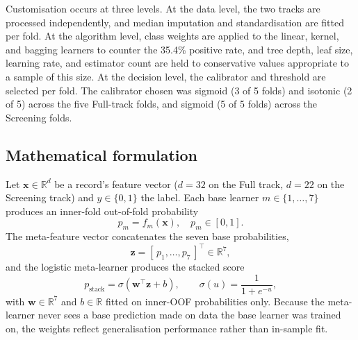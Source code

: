 \documentclass[conference]{IEEEtran}
\begin{document}
Customisation occurs at three levels. At the data level, the two tracks are processed independently, and median imputation and standardisation are fitted per fold. At the algorithm level, class weights are applied to the linear, kernel, and bagging learners to counter the 35.4\% positive rate, and tree depth, leaf size, learning rate, and estimator count are held to conservative values appropriate to a sample of this size. At the decision level, the calibrator and threshold are selected per fold. The calibrator chosen was sigmoid (3 of 5 folds) and isotonic (2 of 5) across the five Full-track folds, and sigmoid (5 of 5 folds) across the Screening folds.

\subsection{Mathematical formulation}
Let $\mathbf{x}\in\mathbb{R}^d$ be a record's feature vector ($d=32$ on the Full track, $d=22$ on the Screening track) and $y\in\{0,1\}$ the label. Each base learner $m\in\{1,\ldots,7\}$ produces an inner-fold out-of-fold probability
\begin{equation}
p_m = f_m(\mathbf{x}), \quad p_m \in [0,1]. \label{eq:base}
\end{equation}
The meta-feature vector concatenates the seven base probabilities,
\begin{equation}
\mathbf{z} = [\,p_1,\ldots,p_7\,]^{\top} \in \mathbb{R}^{7}, \label{eq:meta}
\end{equation}
and the logistic meta-learner produces the stacked score
\begin{equation}
p_{\mathrm{stack}} = \sigma\!\left(\mathbf{w}^{\top}\mathbf{z}+b\right), \qquad \sigma(u)=\frac{1}{1+e^{-u}}, \label{eq:stack}
\end{equation}
with $\mathbf{w}\in\mathbb{R}^{7}$ and $b\in\mathbb{R}$ fitted on inner-OOF probabilities only. Because the meta-learner never sees a base prediction made on data the base learner was trained on, the weights reflect generalisation performance rather than in-sample fit.
\end{document}
